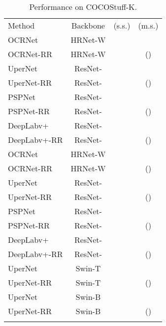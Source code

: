 \documentclass[final]{cvpr}
\begin{document}
\begin{table}[t]
	\centering
	\setlength{\tabcolsep}{2.0pt}
	\caption{Performance on COCOStuff-K.}
	\resizebox{1.00\linewidth}{!}
	{
		\begin{tabular}{l|ccc}
			\shline
			Method &Backbone  &(s.s.) &(m.s.) \\
			\shline
			OCRNet               &HRNet-W   & & \\
			OCRNet-RR            &HRNet-W   & &() \\
			UperNet              &ResNet-  & & \\
			UperNet-RR           &ResNet-  & &() \\
			PSPNet               &ResNet-  & & \\
			PSPNet-RR            &ResNet-  & &() \\
			DeepLabv+         &ResNet-  & &                \\
			DeepLabv+-RR      &ResNet-  & &() \\
			\shline
			OCRNet               &HRNet-W    & & \\
			OCRNet-RR            &HRNet-W    & &()\\
			UperNet              &ResNet-  & & \\
			UperNet-RR           &ResNet-  & &() \\
			PSPNet               &ResNet-  & & \\
			PSPNet-RR            &ResNet-  & &() \\
            DeepLabv+         &ResNet-  & &\\
			DeepLabv+-RR      &ResNet-  & &() \\
			\shline
			UperNet              &Swin-T         & & \\
			UperNet-RR           &Swin-T         & &() \\
			UperNet              &Swin-B\dag     & & \\
			UperNet-RR           &Swin-B\dag     & &() \\
			\shline
		\end{tabular}
	}
    \label{tab:main_cocostuff164k}
	\vspace{-0.2in}
\end{table}
\end{document}
